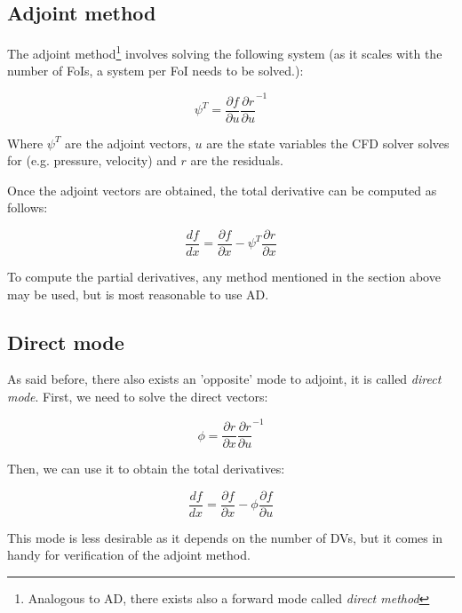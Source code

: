 \subsection{Adjoint method}
The adjoint method\footnote{Analogous to AD, there exists also a forward mode
called \textit{direct method}} involves solving the following system (as it
scales with the number of FoIs, a system per FoI needs to be solved.):

\begin{equation}
    \psi^T = \frac{\partial f}{\partial u} \frac{\partial r}{\partial u}^{-1}
\end{equation}

\noindent Where $\psi^T$ are the adjoint vectors, $u$ are the state variables
the CFD solver solves for (e.g. pressure, velocity) and $r$ are the residuals.

Once the adjoint vectors are obtained, the total derivative can be computed as
follows:

\begin{equation}
    \frac{df}{dx} = \frac{\partial f}{\partial x} - 
    \psi^T \frac{\partial r}{\partial x}
\end{equation}


\noindent To compute the partial derivatives, any method mentioned in the
section above may be used, but is most reasonable to use AD. \cite{mdobook}



\subsection{Direct mode}
As said before, there also exists an 'opposite' mode to adjoint, it is called
\textit{direct mode}. First, we need to solve the direct vectors:

\begin{equation}
    \phi = \frac{\partial r}{\partial x} \frac{\partial r}{\partial u}^{-1}
\end{equation}

\noindent Then, we can use it to obtain the total derivatives:

\begin{equation}
    \frac{df}{dx} = \frac{\partial f}{\partial x} -
    \phi \frac{\partial f}{\partial u}
\end{equation}

\noindent This mode is less desirable as it depends on the number of DVs, but
it comes in handy for verification of the adjoint method.




